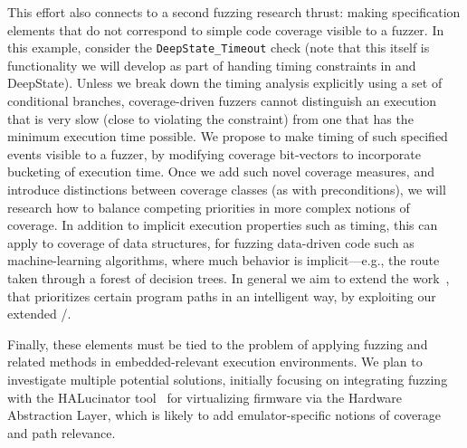   This effort also connects to a second fuzzing research thrust: making specification elements that do not correspond to simple code coverage visible to a fuzzer.  In this example, consider the {\tt DeepState\_Timeout} check (note that this itself is functionality we will develop as part of handing timing constraints in \framac and DeepState).  Unless we break down the timing analysis explicitly using a set of conditional branches, coverage-driven fuzzers cannot distinguish an execution that is very slow (close to violating the constraint) from one that has the minimum execution time possible.  We propose to make timing of such specified events visible to a fuzzer, by modifying coverage bit-vectors to incorporate bucketing of execution time.  Once we add such novel coverage measures, and introduce distinctions between coverage classes (as with preconditions), we will research how to balance competing priorities in more complex notions of coverage.  In addition to implicit execution properties such as timing, this can apply to coverage of data structures, for fuzzing data-driven code such as machine-learning algorithms, where much behavior is implicit---e.g., the route taken through a forest of decision trees.  In general we aim to extend the work~\cite{aflfast,lemieux2018fairfuzz,vuzzer,zhao2019send,aschermann2019redqueen}, that prioritizes certain program paths in an intelligent way, by exploiting our extended \acsl/\eacsl.

Finally, these elements must be tied to the problem of applying fuzzing and related methods in embedded-relevant execution environments.  We plan to investigate multiple potential solutions, initially focusing on integrating fuzzing with the HALucinator tool~\cite{halucinator} for virtualizing firmware via the Hardware Abstraction Layer, which is likely to add emulator-specific notions of coverage and path relevance.


